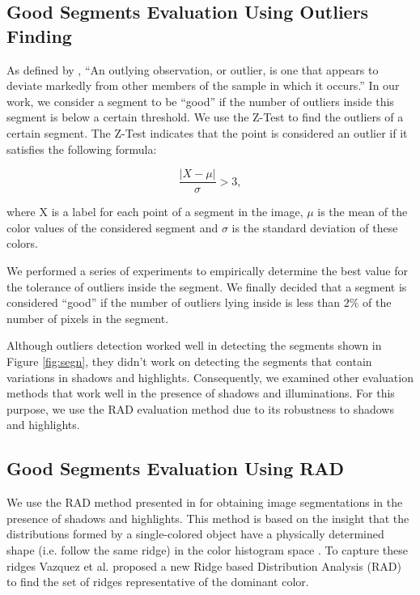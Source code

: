 \documentclass[10pt,twocolumn,letterpaper]{article}
\begin{document}
\subsection{Good Segments Evaluation Using Outliers Finding}

As defined by \cite{grubbs-1969}, ``An outlying observation, or outlier, is one
that appears to deviate markedly from other members of the sample in which it
occurs.'' In our work, we consider a segment to be ``good'' if the number of outliers inside this
segment is below a certain threshold. We use the Z-Test to find the outliers of a certain segment. The Z-Test
indicates that the point is considered an outlier if it satisfies the following
formula:

\begin{equation}
\frac{|X - \mu|}{\sigma} > 3,
\end{equation}

where X is a label for each point of a segment in the image, $\mu$ is the mean of the color
values of the considered segment and $\sigma$ is the standard deviation of these colors.

We performed a series of experiments to empirically determine the best value
for the tolerance of outliers inside the segment. We finally decided that a
segment is considered ``good'' if the number of outliers lying inside is less
than $2\%$ of the number of pixels in the segment.

Although outliers detection worked well in detecting the segments shown in Figure
\ref{fig:segn}, they didn't work on detecting the segments that contain variations
in shadows and highlights. Consequently, we examined other evaluation methods
that work well in the presence of shadows and illuminations. For this purpose, we use the
RAD evaluation method due to its robustness to shadows and highlights.

\subsection{Good Segments Evaluation Using RAD}

We use the RAD method presented in \cite{1478239} for obtaining image
segmentations in the presence of shadows and highlights. This method is based on
the insight that the distributions formed by a single-colored object have a
physically determined shape (i.e. follow the same ridge) in the color histogram space \cite{Sha85}.
To capture these ridges Vazquez et al. \cite{1478239} proposed a new Ridge based
Distribution Analysis (RAD) to find the set of ridges representative of the dominant color.
\end{document}
